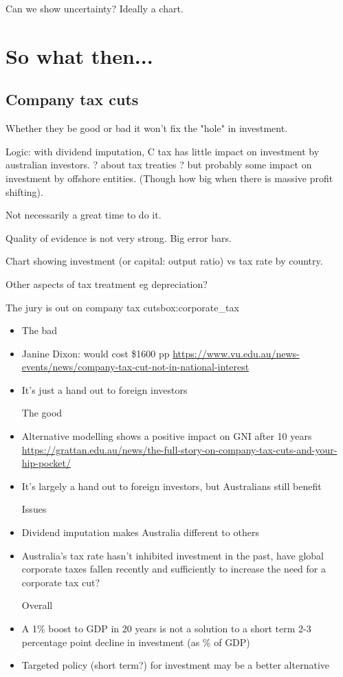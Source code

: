 Can we show uncertainty? Ideally a chart. 


\chapter{So what then...} \label{chap_e}
\section{Company tax cuts}
Whether they be good or bad it won't fix the "hole" in investment.

Logic: with dividend imputation, C tax has little impact on investment by australian investors. ? about tax treaties ? but probably some impact on investment by offshore entities. (Though how big when there is massive profit shifting). 

Not necessarily a great time to do it. 

Quality of evidence is not very strong. Big error bars.

Chart showing investment (or capital: output ratio) vs tax rate by country. 

Other aspects of tax treatment eg depreciation?

\begin{smallbox}{The jury is out on company tax cuts}{box:corporate_tax}

\begin{itemize}
    \item[] The bad
    \item Janine Dixon: would cost \$1600 pp
    \url{https://www.vu.edu.au/news-events/news/company-tax-cut-not-in-national-interest}
    \item It's just a hand out to foreign investors
    
    The good
    \item Alternative modelling shows a positive impact on GNI after 10 years \url{https://grattan.edu.au/news/the-full-story-on-company-tax-cuts-and-your-hip-pocket/}
    \item It's largely a hand out to foreign investors, but Australians still benefit
    
    Issues
    \item Dividend imputation makes Australia different to others
    \item Australia's tax rate hasn't inhibited investment in the past, have global corporate taxes fallen recently and sufficiently to increase the need for a corporate tax cut?
    
    Overall
    \item A 1\% boost to GDP in 20 years is not a solution to a short term 2-3 percentage point decline in investment (as \% of GDP)
    \item Targeted policy (short term?) for investment may be a better alternative
    
\end{itemize}
\end{smallbox}

